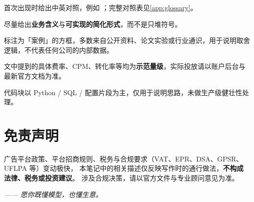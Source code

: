 \begin{description}[leftmargin=5em, style=nextline]
  \item[术语] 首次出现时给出中英对照，例如 ；完整对照表见\cref{app:glossary}。
  \item[公式] 尽量给出\textbf{业务含义}与\textbf{可实现的简化形式}，而不是只堆符号。
  \item[案例] 标注为「案例」的方框，多数来自公开资料、论文实验或行业通识，用于说明取舍逻辑，不代表任何公司的内部数据。
  \item[数据] 文中提到的具体费率、CPM、转化率等均为\textbf{示范量级}，实际投放请以账户后台与最新官方文档为准。
  \item[代码] 代码块以 Python / SQL / 配置片段为主，仅用于说明思路，未做生产级健壮性处理。
\end{description}

\section*{免责声明}

广告平台政策、平台招商规则、税务与合规要求（VAT、EPR、DSA、GPSR、UFLPA 等）变动极快，
本笔记中的相关描述仅反映写作时的通行做法，\textbf{不构成法律、税务或投资建议}。
涉及合规决策，请以官方文件与专业顾问意见为准。

\vspace{1cm}
\begin{flushright}
\textit{—— 愿你既懂模型，也懂生意。}
\end{flushright}
